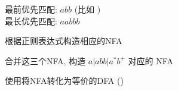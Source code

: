 
\begin{frame}{}

  \vspace{0.30cm}
  \begin{center}
  \end{center}
\end{frame}

\begin{frame}{}

  \vspace{0.60cm}
  \begin{center}
    最前优先匹配: $abb$ (比如 ) \\[10pt]
    最长优先匹配: $aabbb$
  \end{center}
\end{frame}

\begin{frame}{}
  \begin{center}
    根据正则表达式构造相应的NFA
  \end{center}

\end{frame}

\begin{frame}{}
  \begin{center}
    合并这三个NFA, 构造 $a | abb | a^{\ast}b^{+}$ 对应的 NFA
  \end{center}

\end{frame}

\begin{frame}{}
  \begin{center}
    使用将NFA转化为等价的DFA ()


    \vspace{0.30cm}
  \end{center}
\end{frame}

